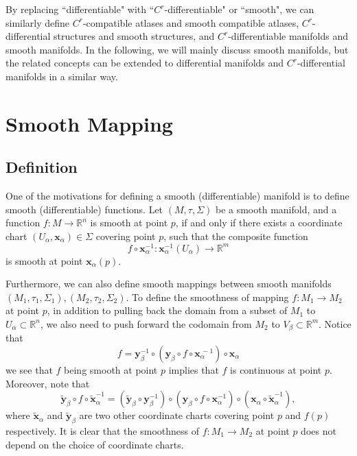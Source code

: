 \documentclass{report}
\begin{document}
By replacing ``differentiable" with ``$C^r$-differentiable" or ``smooth", we can similarly define $C^r$-compatible atlases and smooth compatible atlases, $C^r$-differential structures and smooth structures, and $C^r$-differentiable manifolds and smooth manifolds. In the following, we will mainly discuss smooth manifolds, but the related concepts can be extended to differential manifolds and $C^r$-differential manifolds in a similar way.


\chapter{Smooth Mapping}
\section{Definition}
One of the motivations for defining a smooth (differentiable) manifold is to define smooth (differentiable) functions. Let $(M,\tau,\Sigma)$ be a smooth manifold, and a function $f:M\to \mathbb{R}^n$ is smooth at point $p$, if and only if there exists a coordinate chart $(U_\alpha,\mathbf{x}_\alpha)\in\Sigma$ covering point $p$, such that the composite function
$$
f\circ \mathbf{x}^{-1}_\alpha:\mathbf{x}^{-1}_\alpha(U_\alpha)\longrightarrow \mathbb{R}^m
$$
is smooth at point $\mathbf{x}_\alpha(p)$.

Furthermore, we can also define smooth mappings between smooth manifolds $(M_1,\tau_1,\Sigma_1), (M_2,\tau_2,\Sigma_2)$. To define the smoothness of mapping $f:M_1\to M_2$ at point $p$, in addition to pulling back the domain from a subset of $M_1$ to $U_\alpha\subset\mathbb{R}^n$, we also need to push forward the codomain from $M_2$ to $V_\beta\subset\mathbb{R}^m$.
Notice that
\[
    f = \mathbf{y}^{-1}_\beta\circ(\mathbf{y}_\beta \circ f\circ \mathbf{x}^{\hspace{2pt}-1}_\alpha)\circ\mathbf{x}_\alpha
\]
we see that $f$ being smooth at point $p$ implies that $f$ is continuous at point $p$.
Moreover, note that 
\[
    \tilde{\mathbf{y}}_\beta \circ f\circ \tilde{\mathbf{x}}_\alpha^{-1}=(\tilde{\mathbf{y}}_\beta\circ\mathbf{y}_\beta^{-1}) \circ(\mathbf{y}_\beta \circ f\circ \mathbf{x}_\alpha^{-1})\circ(\mathbf{x}_\alpha\circ \tilde{\mathbf{x}}_\alpha^{-1}),
\]
where $\tilde{\mathbf{x}}_\alpha$ and $\tilde{\mathbf{y}}_\beta$ are two other coordinate charts covering point $p$ and $f(p)$ respectively. It is clear that the smoothness of $f:M_1\to M_2$ at point $p$ does not depend on the choice of coordinate charts.
\end{document}
